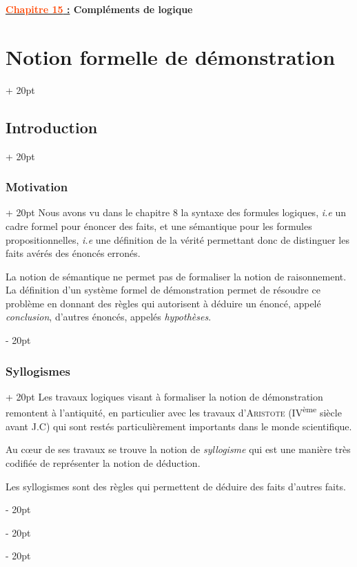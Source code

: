 \documentclass[a4paper, 12pt, twoside]{article}
\newcommand{\Emph}{\textcolor{ff4500}}
\newcommand{\ind}[1][20pt]{\advance\leftskip + #1}
\newcommand{\deind}[1][20pt]{\advance\leftskip - #1}
\newenvironment{indt}[2][20pt]{#2 \par \ind[#1]}{\par \deind} %
\newcommand{\thetitle}[2]{\begin{center}\textbf{{\LARGE \underline{\Emph{#1} :}} {\Large #2}}\end{center}}
\begin{document}
    
    \thetitle{Chapitre 15}{Compléments de logique}
    
    \tableofcontents
    \newpage
    
    \begin{indt}{\section{Notion formelle de démonstration}}
        \begin{indt}{\subsection{Introduction}}
            \begin{indt}{\subsubsection{Motivation}}
                Nous avons vu dans le chapitre 8 la syntaxe des formules logiques, \textit{i.e} un cadre formel pour énoncer des faits, et une sémantique pour les formules propositionnelles, \textit{i.e} une définition de la vérité permettant donc de distinguer les faits avérés des énoncés erronés.

                La notion de sémantique ne permet pas de formaliser la notion de raisonnement. La définition d'un système formel de démonstration permet de résoudre ce problème en donnant des règles qui autorisent à déduire un énoncé, appelé \emph{conclusion}, d'autres énoncés, appelés \emph{hypothèses}.
            \end{indt}

            \vspace{12pt}
            
            \begin{indt}{\subsubsection{Syllogismes}}
                Les travaux logiques visant à formaliser la notion de démonstration remontent à l'antiquité, en particulier avec les travaux d'\textsc{Aristote} (IV\textsuperscript{ème} siècle avant J.C) qui sont restés particulièrement importants dans le monde scientifique.

                Au c\oe ur de ses travaux se trouve la notion de \emph{syllogisme} qui est une manière très codifiée de représenter la notion de déduction.

                Les syllogismes sont des règles qui permettent de déduire des faits d'autres faits.


\end{indt}
\end{indt}
\end{indt}
\end{document}
